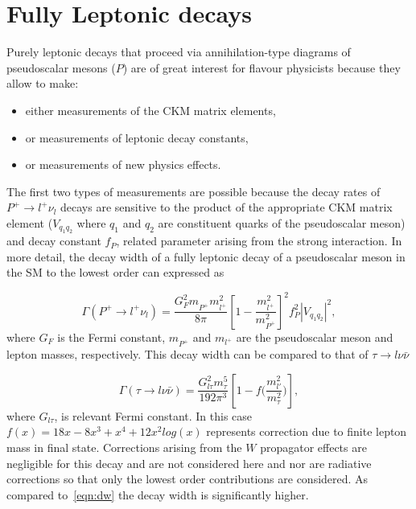 \section{Fully Leptonic  decays}
\label{lnudecays}
Purely leptonic decays that proceed via annihilation-type diagrams of pseudoscalar mesons ($P$) are of great interest for flavour physicists because they allow to make:
\begin{itemize}
\item either measurements of the \gls{CKM} matrix elements,
\item or measurements of leptonic decay constants,
\item or measurements of new physics effects.
\end{itemize}
The first two types of measurements are possible because the decay rates of $P^{+}\rightarrow l^{+} \nu_{l}$ decays are sensitive to the product of the appropriate \gls{CKM} matrix element ($V_{q_{1}q_{2}}$ where $q_{1}$ and $q_{2}$ are constituent quarks of the pseudoscalar meson) and decay constant $f_{P}$, related parameter arising from the strong interaction. In more detail, the decay width of a fully leptonic decay of a pseudoscalar meson in the \gls{SM} to the lowest order can expressed as 

\begin{equation}
\Gamma(P^{+} \rightarrow {l^{+}} \nu_{l})=  
	\frac{G_{F}^{2} m^{}_{P^{+}}  m_{l^{+}}^{2}}{8\pi} 
	\left[1 - \frac{m_{l^{+}}^{2}}{m_{P^{+}}^{2}}\right]^{2}  
	f_{P}^{2} |V_{q_{1}q_{2}}|^{2} 
	,
\label{eqn:dw} 
\end{equation}
where
$G_F$ is the Fermi constant,
$m^{}_{P^{+}}$ and $m_{l^{+}}$ are the pseudoscalar meson and lepton masses, respectively. This decay width can be compared to that of $\tau \rightarrow l\nu \bar{\nu}$\cite{Marciano:1988vm}


\begin{equation}
\Gamma(\tau \rightarrow {l} \nu \bar{\nu})=
	\frac{G^{2}_{l\tau} m^{5}_{\tau}}{192\pi^{3}}\left[1-f\big(\frac{m^{2}_{l'}}{{m^{2}_{\tau}}}\big)\right],
\label{eqn:tauonic} 
\end{equation}
where $G_{l\tau}$, is relevant Fermi constant. In this case $ f(x) = 1  8x - 8x^{3} + x^{4} + 12x^{2}log(x)$ represents correction due to finite lepton mass in final state. Corrections arising from the $W$ propagator effects are negligible for this decay and are not considered here and nor are radiative corrections so that only the lowest order contributions are considered. As compared to~\autoref{eqn:dw} the decay width is significantly higher. 

